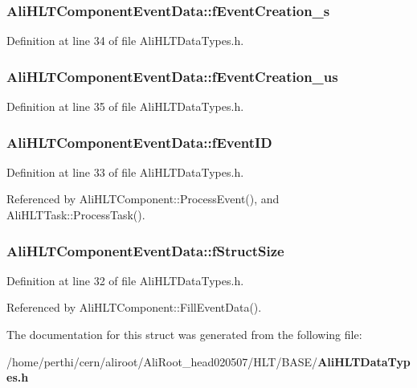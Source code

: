 \subsubsection{ {\bf Ali\-HLTComponent\-Event\-Data::f\-Event\-Creation\_\-s}}\label{structAliHLTComponentEventData_o2}




Definition at line 34 of file Ali\-HLTData\-Types.h.
\subsubsection{ {\bf Ali\-HLTComponent\-Event\-Data::f\-Event\-Creation\_\-us}}\label{structAliHLTComponentEventData_o3}




Definition at line 35 of file Ali\-HLTData\-Types.h.
\subsubsection{ {\bf Ali\-HLTComponent\-Event\-Data::f\-Event\-ID}}\label{structAliHLTComponentEventData_o1}




Definition at line 33 of file Ali\-HLTData\-Types.h.

Referenced by Ali\-HLTComponent::Process\-Event(), and Ali\-HLTTask::Process\-Task().
\subsubsection{ {\bf Ali\-HLTComponent\-Event\-Data::f\-Struct\-Size}}\label{structAliHLTComponentEventData_o0}




Definition at line 32 of file Ali\-HLTData\-Types.h.

Referenced by Ali\-HLTComponent::Fill\-Event\-Data().

The documentation for this struct was generated from the following file:\begin{CompactItemize}
\item 
/home/perthi/cern/aliroot/Ali\-Root\_\-head020507/HLT/BASE/{\bf Ali\-HLTData\-Types.h}\end{CompactItemize}
